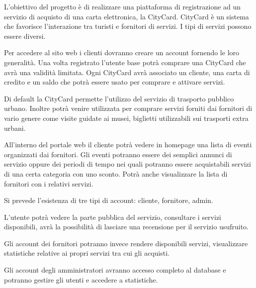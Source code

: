L’obiettivo del progetto è di realizzare una piattaforma di registrazione ad un servizio di acquisto di una carta elettronica, la CityCard.
CityCard è un sistema che favorisce l’interazione tra turisti e fornitori di servizi. I tipi di servizi possono essere diversi.

Per accedere al sito web i clienti dovranno creare un account fornendo le loro generalità.
Una volta registrato l’utente base  potrà comprare una CityCard che avrà una validità limitata. Ogni CityCard avrà associato un cliente, una carta di credito e un saldo che potrà essere usato per comprare e attivare servizi. 

Di default la CityCard permette l’utilizzo del servizio di trasporto pubblico urbano. Inoltre potrà venire utilizzata per comprare servizi forniti dai fornitori di vario genere come visite guidate ai musei, biglietti utilizzabili sui trasporti extra urbani. 

All’interno del portale web il cliente potrà vedere in homepage una lista di eventi organizzati dai fornitori. 
Gli eventi potranno essere dei semplici annunci di servizio oppure dei periodi di tempo nei quali potranno essere acquistabili servizi di una certa categoria con uno sconto.
Potrà anche visualizzare la lista di fornitori con i relativi servizi.

Si prevede l'esistenza di tre tipi di account: cliente, fornitore, admin.

L'utente potrà vedere la parte pubblica del servizio, consultare i servizi disponibili, avrà la possibilità di lasciare una recensione per il servizio usufruito.

Gli account dei fornitori potranno invece rendere disponibili servizi, visualizzare statistiche relative ai propri servizi tra cui gli acquisti.

Gli account degli amministratori avranno accesso completo al database e potranno gestire gli utenti e accedere a statistiche. 

